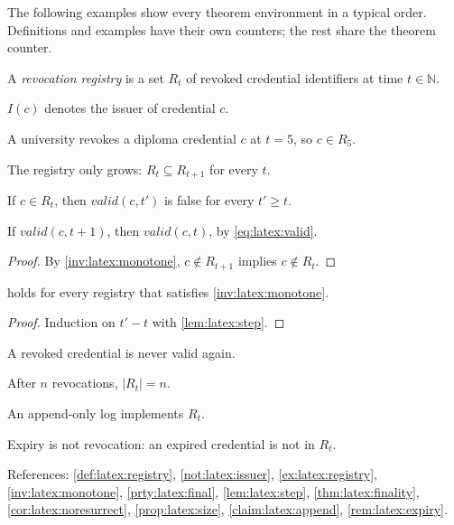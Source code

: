 The following examples show every theorem environment in a typical order.
Definitions and examples have their own counters; the rest share the theorem counter.
\begin{definition}\label{def:latex:registry}
A \emph{revocation registry} is a set $R_t$ of revoked credential identifiers at time $t \in \mathbb{N}$.
\end{definition}
\begin{notation}\label{not:latex:issuer}
$I(c)$ denotes the issuer of credential $c$.
\end{notation}
\begin{example}\label{ex:latex:registry}
A university revokes a diploma credential $c$ at $t=5$, so $c \in R_5$.
\end{example}
\begin{invariant}\label{inv:latex:monotone}
The registry only grows: $R_t \subseteq R_{t+1}$ for every $t$.
\end{invariant}
\begin{property}\label{prty:latex:final}
If $c \in R_t$, then $\mathit{valid}(c, t')$ is false for every $t' \geq t$.
\end{property}
\begin{lemma}\label{lem:latex:step}
If $\mathit{valid}(c, t+1)$, then $\mathit{valid}(c, t)$, by \cref{eq:latex:valid}.
\end{lemma}
\begin{proof}
By \cref{inv:latex:monotone}, $c \notin R_{t+1}$ implies $c \notin R_t$.
\end{proof}
\begin{theorem}[Finality]\label{thm:latex:finality}
 holds for every registry that satisfies \cref{inv:latex:monotone}.
\end{theorem}
\begin{proof}
Induction on $t' - t$ with \cref{lem:latex:step}.
\end{proof}
\begin{corollary}\label{cor:latex:noresurrect}
A revoked credential is never valid again.
\end{corollary}
\begin{proposition}\label{prop:latex:size}
After $n$ revocations, $|R_t| = n$.
\end{proposition}
\begin{claim}\label{claim:latex:append}
An append-only log implements $R_t$.
\end{claim}
\begin{remark}\label{rem:latex:expiry}
Expiry is not revocation: an expired credential is not in $R_t$.
\end{remark}
References: \cref{def:latex:registry}, \cref{not:latex:issuer}, \cref{ex:latex:registry}, \cref{inv:latex:monotone}, \cref{prty:latex:final}, \cref{lem:latex:step}, \cref{thm:latex:finality}, \cref{cor:latex:noresurrect}, \cref{prop:latex:size}, \cref{claim:latex:append}, \cref{rem:latex:expiry}.

